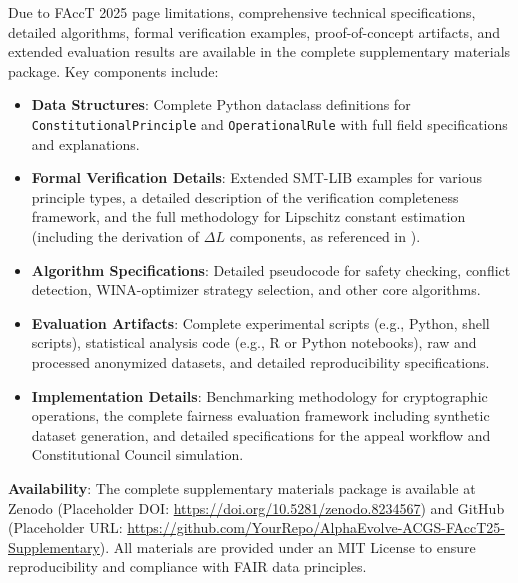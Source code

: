 \documentclass[manuscript,screen,review,anonymous,9pt]{acmart}
\begin{document}
Due to FAccT 2025 page limitations, comprehensive technical specifications, detailed algorithms, formal verification examples, proof-of-concept artifacts, and extended evaluation results are available in the complete supplementary materials package. Key components include:
\begin{itemize}[leftmargin=*,itemsep=1pt,parsep=1pt]
    \item \textbf{Data Structures}: Complete Python dataclass definitions for \texttt{ConstitutionalPrinciple} and \texttt{OperationalRule} with full field specifications and explanations.
    \item \textbf{Formal Verification Details}: Extended SMT-LIB examples for various principle types, a detailed description of the verification completeness framework, and the full methodology for Lipschitz constant estimation (including the derivation of $\Delta L$ components, as referenced in ).
    \item \textbf{Algorithm Specifications}: Detailed pseudocode for safety checking, conflict detection, WINA-optimizer strategy selection, and other core algorithms.
    \item \textbf{Evaluation Artifacts}: Complete experimental scripts (e.g., Python, shell scripts), statistical analysis code (e.g., R or Python notebooks), raw and processed anonymized datasets, and detailed reproducibility specifications.
    \item \textbf{Implementation Details}: Benchmarking methodology for cryptographic operations, the complete fairness evaluation framework including synthetic dataset generation, and detailed specifications for the appeal workflow and Constitutional Council simulation.
\end{itemize}
\textbf{Availability}: The complete supplementary materials package is available at Zenodo (Placeholder DOI: \url{https://doi.org/10.5281/zenodo.8234567}) and GitHub (Placeholder URL: \url{https://github.com/YourRepo/AlphaEvolve-ACGS-FAccT25-Supplementary}). All materials are provided under an MIT License to ensure reproducibility and compliance with FAIR data principles.
\end{document}
